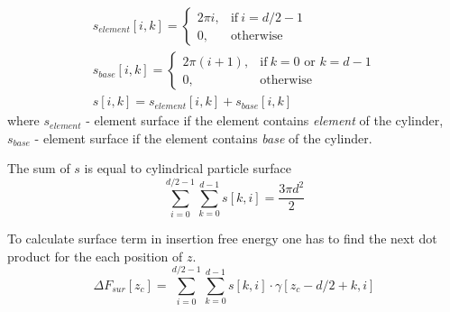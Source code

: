 \documentclass[12pt, a4paper]{article}
\newcommand\todo[1]{\textcolor{red}{#1}}
\begin{document}
\begin{eqnarray}
    s_{element}[i,k] = 
    \begin{cases}
        2 \pi i,   & \text{if}\ i=d/2-1 \\
        0,         & \text{otherwise}
    \end{cases}
    \\
    s_{base}[i,k] = 
    \begin{cases}
        2\pi(i+1), & \text{if}\ k=0 \text{ or } k=d-1 \\
        0,         & \text{otherwise}
    \end{cases}
    \\
    s[i,k] = s_{element}[i,k] + s_{base}[i,k]
\end{eqnarray}
where $s_{element}$ - element surface if the element contains \emph{element} of the cylinder,
$s_{base}$ - element surface if the element contains \emph{base} of the cylinder.

The sum of $s$ is equal to cylindrical particle surface
\begin{equation}
    \sum_{i=0}^{d/2-1} \sum_{k=0}^{d-1} s[k,i] = \frac{3 \pi d^2}{2}
\end{equation}

To calculate surface term in insertion free energy one has to find the next dot product for the each position of $z$.
\begin{equation}
    \Delta F_{sur}[z_c] = \sum_{i=0}^{d/2-1} \sum_{k=0}^{d-1} s[k,i] \cdot \gamma[z_c-d/2+k, i]
\end{equation}


\end{document}
